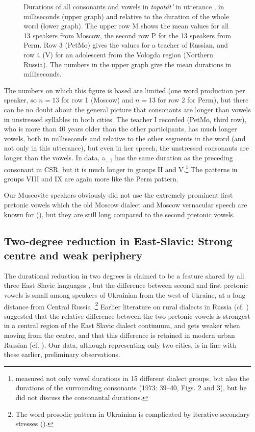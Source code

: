 \documentclass[output=paper]{langscibook}
\begin{document}
\begin{figure}
\caption{\label{fig:post:7} Durations of all consonants and vowels in \textit{topotát'} in utterance , in milliseconds (upper graph) and relative to the duration of the whole word (lower graph). The upper row M shows the mean values for all 13 speakers from Moscow, the second row P for the 13 speakers from Perm. Row 3 (PetMo) gives the values for a teacher of Russian, and row 4 (V) for an adolescent from the Vologda region (Northern Russia). The numbers in the upper graph give the mean durations in milliseconds.}
\end{figure}


The numbers on which this figure is based are limited (one word production per speaker, so $n = 13$ for row 1 (Moscow) and $n = 13$ for row 2 for Perm), but there can be no doubt about the general picture that consonants are longer than vowels in unstressed syllables in both cities. The teacher I recorded (PetMo, third row), who is more than 40 years older than the other participants, has much longer vowels, both in milliseconds and relative to the other segments in the word (and not only in this utterance), but even in her speech, the unstressed consonants are longer than the vowels. In  data, a\textsubscript{$-1$} has the same duration as the preceding consonant in CSR, but it is much longer in groups II and V.\footnote{\citet{Vysotskij1973} measured not only vowel durations in 15 different dialect groups, but also the durations of the surrounding consonants (1973: 39--40, Figs. 2 and 3), but he did not discuss the consonantal durations.} The patterns in groups VIII and IX are again more like the Perm pattern.



Our Muscovite speakers obviously did not use the extremely prominent first pretonic vowels which the old Moscow dialect and Moscow vernacular speech are known for (\citealt{Vysotskij1973, Lapteva1999}), but they are still long compared to the second pretonic vowels.


\subsection{Two-degree reduction in East-Slavic: Strong centre and weak periphery}
\label{sec:post:4.3}
The durational reduction in two degrees is claimed to be a feature shared by all three East Slavic languages \citep{Dubina2012}, but the difference between second and first pretonic vowels is small among speakers of Ukrainian from the west of Ukraine, at a long distance from Central Russia \citep{ŁukaszewiczEtAl2022}.\footnote{The word prosodic pattern in Ukrainian is complicated by iterative secondary stresses (\citealt{ŁukaszewiczMołczanow2018}).} Earlier literature on rural dialects in Russia (cf. ) suggested that the relative difference between the two pretonic vowels is strongest in a central region of the East Slavic dialect continuum, and gets weaker when moving from the centre, and that this difference is retained in modern urban Russian (cf. ). Our data, although representing only two cities, is in line with these earlier, preliminary observations.
\end{document}
